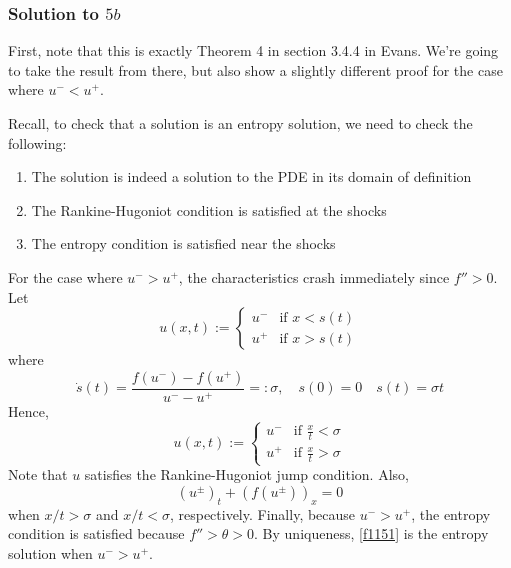 \subsubsection*{Solution to $5b$}

First, note that this is exactly Theorem 4 in section 3.4.4 in Evans. We're going to take the result from there, but also show a slightly different proof for the case where $u^- < u^+$.

\vspace{0.2cm}

\noindent
Recall, to check that a solution is an entropy solution, we need to check the following:
\begin{enumerate}
\item The solution is indeed a solution to the PDE in its domain of definition

\item The Rankine-Hugoniot condition is satisfied at the shocks

\item The entropy condition is satisfied near the shocks
\end{enumerate}

For the case where $u^- > u^+$, the characteristics crash immediately since $f'' > 0$. Let
$$ u(x,t) := \left\{
\begin{array}{ll}
u^- & \text{if} \,\, x < s(t) \\
u^+ & \text{if} \,\, x > s(t)
\end{array} \right. $$
where
$$ \dot{s}(t) = \frac{f(u^-) - f(u^+)}{u^- - u^+} =: \sigma, \quad s(0) = 0 \quad s(t) = \sigma t $$
Hence,
\begin{equation}
\label{f1151}
u(x,t) := \left\{
\begin{array}{ll}
u^- & \text{if} \,\, \frac{x}{t} < \sigma \\
u^+ & \text{if} \,\, \frac{x}{t} > \sigma
\end{array} \right.
\end{equation}
Note that $u$ satisfies the Rankine-Hugoniot jump condition. Also,
$$ (u^{\pm})_t + (f(u^{\pm}))_x = 0 $$
when $x/t > \sigma$ and $x/t < \sigma$, respectively. Finally, because $u^- > u^+$, the entropy condition is satisfied because $f'' > \theta > 0$. By uniqueness, \eqref{f1151} is the entropy solution when $u^- > u^+$.

\vspace{0.2cm}

